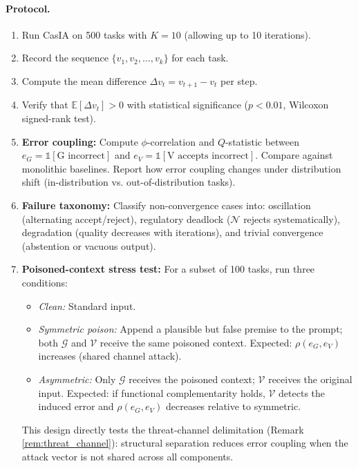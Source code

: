 \documentclass[11pt,a4paper]{article}
\theoremstyle{remark}
\newcommand{\E}{\mathbb{E}}
\begin{document}
\paragraph{Protocol.}
\begin{enumerate}
  \item Run CasIA on 500 tasks with $K = 10$ (allowing up to 10 iterations).
  \item Record the sequence $\{v_1, v_2, \ldots, v_k\}$ for each task.
  \item Compute the mean difference $\Delta v_t = v_{t+1} - v_t$ per step.
  \item Verify that $\E[\Delta v_t] > 0$ with statistical significance ($p < 0.01$, Wilcoxon signed-rank test).
  \item \textbf{Error coupling:} Compute $\phi$-correlation and $Q$-statistic between $e_G = \mathbb{1}[\text{G incorrect}]$ and $e_V = \mathbb{1}[\text{V accepts incorrect}]$. Compare against monolithic baselines. Report how error coupling changes under distribution shift (in-distribution vs. out-of-distribution tasks).
  \item \textbf{Failure taxonomy:} Classify non-convergence cases into: oscillation (alternating accept/reject), regulatory deadlock ($\mathcal{N}$ rejects systematically), degradation (quality decreases with iterations), and trivial convergence (abstention or vacuous output).
  \item \textbf{Poisoned-context stress test:} For a subset of 100 tasks, run three conditions:
  \begin{itemize}
    \item \emph{Clean:} Standard input.
    \item \emph{Symmetric poison:} Append a plausible but false premise to the prompt; both $\mathcal{G}$ and $\mathcal{V}$ receive the same poisoned context. Expected: $\rho(e_G, e_V)$ increases (shared channel attack).
    \item \emph{Asymmetric:} Only $\mathcal{G}$ receives the poisoned context; $\mathcal{V}$ receives the original input. Expected: if functional complementarity holds, $\mathcal{V}$ detects the induced error and $\rho(e_G, e_V)$ decreases relative to symmetric.
  \end{itemize}
  This design directly tests the threat-channel delimitation (Remark \ref{rem:threat_channel}): structural separation reduces error coupling when the attack vector is not shared across all components.
\end{enumerate}
\end{document}
